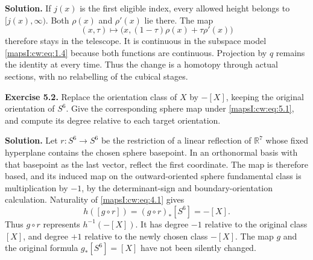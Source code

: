 \textbf{Solution.} If \(j(x)\) is the first eligible index, every allowed height belongs to \([j(x),\infty)\). Both \(\rho(x)\) and \(\rho'(x)\) lie there. The map
\begin{equation}
(x,\tau)\longmapsto
\bigl(x,(1-\tau)\rho(x)+\tau\rho'(x)\bigr)
\label{mapsI:cw:eq:5.2}
\end{equation}
therefore stays in the telescope. It is continuous in the subspace model \eqref{mapsI:cw:eq:1.4} because both functions are continuous. Projection by \(q\) remains the identity at every time. Thus the change is a homotopy through actual sections, with no relabelling of the cubical stages.

\textbf{Exercise 5.2.}\label{mapsI:cw:exercise:5.2} Replace the orientation class of \(X\) by \(-[X]\), keeping the original orientation of \(S^6\). Give the corresponding sphere map under \eqref{mapsI:cw:eq:5.1}, and compute its degree relative to each target orientation.

\textbf{Solution.} Let \(r:S^6\to S^6\) be the restriction of a linear reflection of \(\mathbb R^7\) whose fixed hyperplane contains the chosen sphere basepoint. In an orthonormal basis with that basepoint as the last vector, reflect the first coordinate. The map is therefore based, and its induced map on the outward-oriented sphere fundamental class is multiplication by \(-1\), by the determinant-sign and boundary-orientation calculation. Naturality of \eqref{mapsI:cw:eq:4.1} gives
\begin{equation}
h([g\circ r])=(g\circ r)_*[S^6]=-[X].
\label{mapsI:cw:eq:5.3}
\end{equation}
Thus \(g\circ r\) represents \(h^{-1}(-[X])\). It has degree \(-1\) relative to the original class \([X]\), and degree \(+1\) relative to the newly chosen class \(-[X]\). The map \(g\) and the original formula \(g_*[S^6]=[X]\) have not been silently changed.
